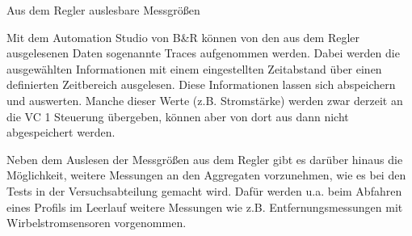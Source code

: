 \begin{table}[H]
\center
{}
\caption{Aus dem Regler auslesbare Messgrößen}
\label{fig_Beispiele_relevanter_Daten_die_aus_dem_Regler_ausgelesen_werden_koennen}
\end{table}



Mit dem Automation Studio von B\&R können von den aus dem Regler ausgelesenen Daten sogenannte Traces aufgenommen werden. Dabei werden die ausgewählten Informationen mit einem eingestellten Zeitabstand über einen definierten Zeitbereich ausgelesen. Diese Informationen lassen sich abspeichern und auswerten. Manche dieser Werte (z.B. Stromstärke) werden zwar derzeit an die VC 1 Steuerung übergeben, können aber von dort aus dann nicht abgespeichert werden. 




Neben dem Auslesen der Messgrößen aus dem Regler gibt es darüber hinaus  die Möglichkeit, weitere Messungen an den Aggregaten vorzunehmen, wie es bei den Tests in der Versuchsabteilung gemacht wird. Dafür werden u.a. beim Abfahren eines Profils im Leerlauf weitere Messungen wie z.B. Entfernungsmessungen mit Wirbelstromsensoren vorgenommen.



